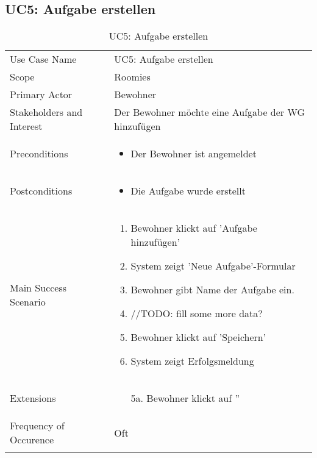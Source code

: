 \subsection{UC5: Aufgabe erstellen}
\begin{table}[H]
	\tablestyle
	\tablealtcolored
	\begin{tabularx}{\textwidth}{lX}
		\tablebody
			Use Case Name &
			UC5: Aufgabe erstellen
			\tabularnewline
			Scope &
			Roomies
			\tabularnewline
			Primary Actor &
			Bewohner
			\tabularnewline
			Stakeholders and Interest &
			Der Bewohner möchte eine Aufgabe der WG hinzufügen
			\tabularnewline
			Preconditions &
			\begin{itemize}
				\item Der Bewohner ist angemeldet
			\end{itemize}
			\tabularnewline
			Postconditions &
			\begin{itemize}
				\item Die Aufgabe wurde erstellt
			\end{itemize}
			\tabularnewline
			Main Success Scenario &
			\begin{enumerate}
				\item Bewohner klickt auf 'Aufgabe hinzufügen'
				\item System zeigt 'Neue Aufgabe'-Formular
				\item Bewohner gibt Name der Aufgabe ein.
				\item //TODO: fill some more data?
				\item Bewohner klickt auf 'Speichern'
				\item System zeigt Erfolgsmeldung
			\end{enumerate}
			\tabularnewline
			Extensions &
			\begin{itemize}
				\item[5a.] Bewohner klickt auf ''
			\end{itemize}
			\tabularnewline
			Frequency of Occurence &
			Oft
			\tabularnewline
		\tableend
	\end{tabularx}
	\caption{UC5: Aufgabe erstellen}
\end{table}


